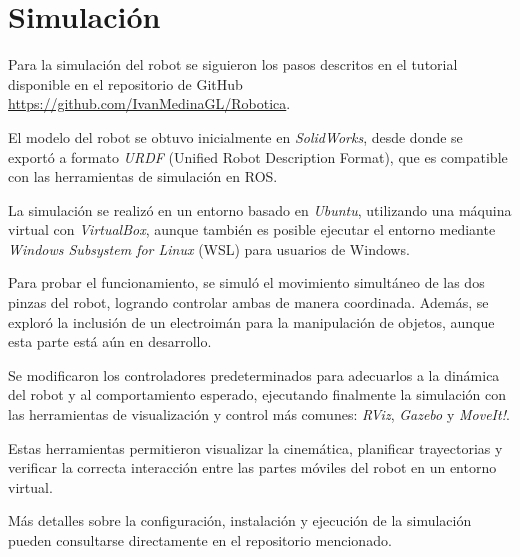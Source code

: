\section{Simulación} \label{sec:simulacion}

Para la simulación del robot se siguieron los pasos descritos en el tutorial disponible en el repositorio de GitHub \cite{medinagl_robotica} \href{https://github.com/IvanMedinaGL/Robotica}{https://github.com/IvanMedinaGL/Robotica}.

El modelo del robot se obtuvo inicialmente en \textit{SolidWorks}, desde donde se exportó a formato \textit{URDF} (Unified Robot Description Format), que es compatible con las herramientas de simulación en ROS.

La simulación se realizó en un entorno basado en \textit{Ubuntu}, utilizando una máquina virtual con \textit{VirtualBox}, aunque también es posible ejecutar el entorno mediante \textit{Windows Subsystem for Linux} (WSL) para usuarios de Windows.

Para probar el funcionamiento, se simuló el movimiento simultáneo de las dos pinzas del robot, logrando controlar ambas de manera coordinada. Además, se exploró la inclusión de un electroimán para la manipulación de objetos, aunque esta parte está aún en desarrollo.

Se modificaron los controladores predeterminados para adecuarlos a la dinámica del robot y al comportamiento esperado, ejecutando finalmente la simulación con las herramientas de visualización y control más comunes: \textit{RViz}, \textit{Gazebo} y \textit{MoveIt!}.

Estas herramientas permitieron visualizar la cinemática, planificar trayectorias y verificar la correcta interacción entre las partes móviles del robot en un entorno virtual.

Más detalles sobre la configuración, instalación y ejecución de la simulación pueden consultarse directamente en el repositorio mencionado.

